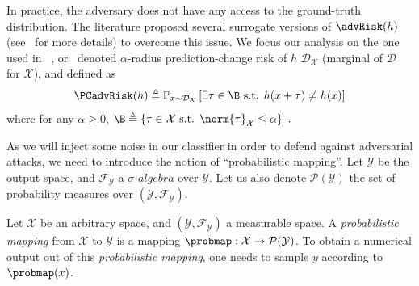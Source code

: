 In practice, the adversary does not have any access to the ground-truth distribution.
The literature proposed several surrogate versions of $\advRisk(h)$ (see~\cite{NIPS2018Mahloujifar} for more details) to overcome this issue.
We focus our analysis on the one used in \eg~\cite{Szegedy2013IntriguingPO}, or~\cite{NIPS2018Fawzi} denoted $\alpha$-radius prediction-change risk of $h$ \wrt $\mathcal{D}_{\mathcal{X}}$ (marginal of $\mathcal{D}$ for $\mathcal{X}$), and defined as   
\begin{align}
    \PCadvRisk(h) \triangleq \mathbb{P}_{x\sim \mathcal{D}_{\mathcal{X}}}\left[\exists \tau \in \B \text{ s.t. } h(x+\tau)\neq h(x) \right]
\end{align}
where for any $\alpha \geq 0$, \quad $\B \triangleq \{\tau \in \mathcal{X} \text{ s.t. } \norm{\tau}_{\mathcal{X}} \leq \alpha\}\enspace.$

As we will inject some noise in our classifier in order to defend against adversarial attacks, we need to introduce the notion of ``probabilistic mapping''. Let $\mathcal{Y}$ be the output space, and $\mathcal{F}_{\mathcal{Y}}$ a $\sigma$-$ algebra$ over $\mathcal{Y}$. Let us also denote $\mathcal{P}(\mathcal{Y})$ the set of probability measures over $(\mathcal{Y},\mathcal{F}_{\mathcal{Y}})$.

\begin{definition} Let $\mathcal{X}$ be an arbitrary space, and $(\mathcal{Y},\mathcal{F}_{\mathcal{Y}})$ a measurable space. A \emph{probabilistic mapping} from $\mathcal{X}$ to $\mathcal{Y}$ is a mapping $\probmap: \mathcal{X} \to \mathcal{P}(\mathcal{Y})$.
To obtain a numerical output out of this \emph{probabilistic mapping}, one needs to sample $y$ according to $\probmap(x)$. %
\end{definition} 


